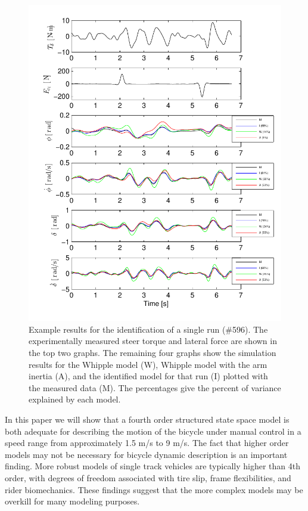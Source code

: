 \documentclass{article}
\begin{document}
\begin{figure}
  \centering
  \includegraphics[width=5.0in]{example-fit.pdf}
  \caption{Example results for the identification of a single run (\#596). The
  experimentally measured steer torque and lateral force are shown in the top
  two graphs. The remaining four graphs show the simulation results for the
  Whipple model (W), Whipple model with the arm inertia (A), and the identified
  model for that run (I) plotted with the measured data (M). The percentages
  give the percent of variance explained by each model.}
\end{figure}

In this paper we will show that a fourth order structured state space model is
both adequate for describing the motion of the bicycle under manual control in
a speed range from approximately 1.5 m/s to 9 m/s. The fact that higher order
models may not be necessary for bicycle dynamic description is an important
finding. More robust models of single track vehicles are typically higher than
4th order, with degrees of freedom associated with tire slip, frame
flexibilities, and rider biomechanics. These findings suggest that the more
complex models may be overkill for many modeling purposes.
\end{document}
